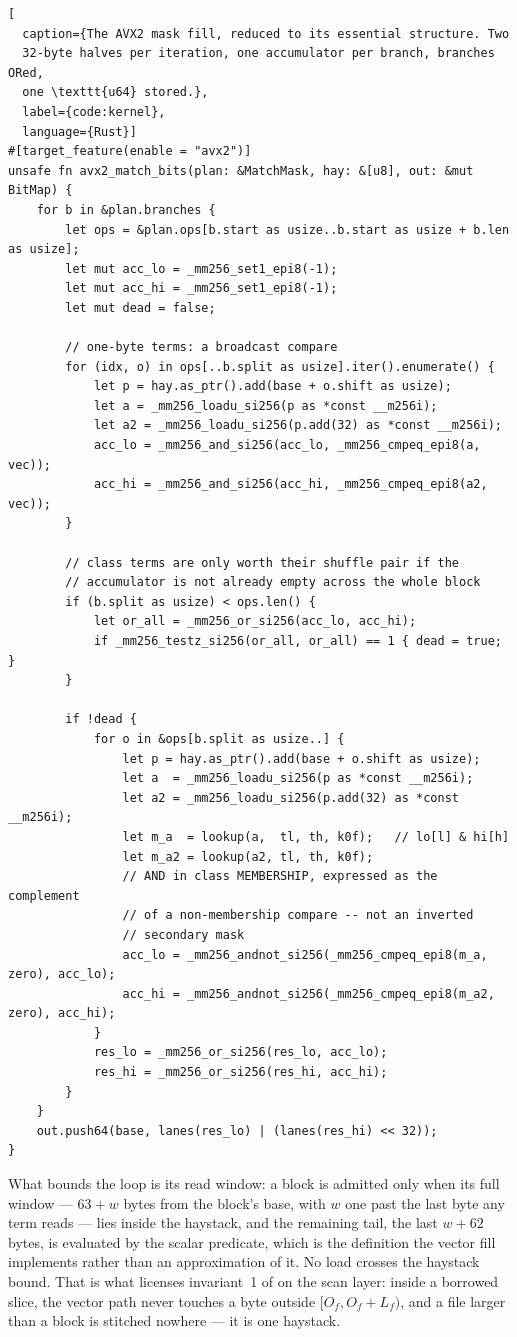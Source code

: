 \documentclass[11pt,letterpaper]{article}
\begin{document}
\begin{lstlisting}[
  caption={The AVX2 mask fill, reduced to its essential structure. Two
  32-byte halves per iteration, one accumulator per branch, branches ORed,
  one \texttt{u64} stored.},
  label={code:kernel},
  language={Rust}]
#[target_feature(enable = "avx2")]
unsafe fn avx2_match_bits(plan: &MatchMask, hay: &[u8], out: &mut BitMap) {
    for b in &plan.branches {
        let ops = &plan.ops[b.start as usize..b.start as usize + b.len as usize];
        let mut acc_lo = _mm256_set1_epi8(-1);
        let mut acc_hi = _mm256_set1_epi8(-1);
        let mut dead = false;

        // one-byte terms: a broadcast compare
        for (idx, o) in ops[..b.split as usize].iter().enumerate() {
            let p = hay.as_ptr().add(base + o.shift as usize);
            let a = _mm256_loadu_si256(p as *const __m256i);
            let a2 = _mm256_loadu_si256(p.add(32) as *const __m256i);
            acc_lo = _mm256_and_si256(acc_lo, _mm256_cmpeq_epi8(a, vec));
            acc_hi = _mm256_and_si256(acc_hi, _mm256_cmpeq_epi8(a2, vec));
        }

        // class terms are only worth their shuffle pair if the
        // accumulator is not already empty across the whole block
        if (b.split as usize) < ops.len() {
            let or_all = _mm256_or_si256(acc_lo, acc_hi);
            if _mm256_testz_si256(or_all, or_all) == 1 { dead = true; }
        }

        if !dead {
            for o in &ops[b.split as usize..] {
                let p = hay.as_ptr().add(base + o.shift as usize);
                let a  = _mm256_loadu_si256(p as *const __m256i);
                let a2 = _mm256_loadu_si256(p.add(32) as *const __m256i);
                let m_a  = lookup(a,  tl, th, k0f);   // lo[l] & hi[h]
                let m_a2 = lookup(a2, tl, th, k0f);
                // AND in class MEMBERSHIP, expressed as the complement
                // of a non-membership compare -- not an inverted
                // secondary mask
                acc_lo = _mm256_andnot_si256(_mm256_cmpeq_epi8(m_a,  zero), acc_lo);
                acc_hi = _mm256_andnot_si256(_mm256_cmpeq_epi8(m_a2, zero), acc_hi);
            }
            res_lo = _mm256_or_si256(res_lo, acc_lo);
            res_hi = _mm256_or_si256(res_hi, acc_hi);
        }
    }
    out.push64(base, lanes(res_lo) | (lanes(res_hi) << 32));
}
\end{lstlisting}

What bounds the loop is its read window: a block is admitted only when its
full window --- $63+w$ bytes from the block's base, with $w$ one past the
last byte any term reads --- lies inside the haystack, and the remaining
tail, the last $w+62$ bytes, is evaluated by the scalar predicate, which is
the definition the vector fill implements rather than an approximation of
it. No load crosses the haystack bound. That is what licenses invariant~1
of  on the scan layer: inside a borrowed slice, the
vector path never touches a byte outside $[O_f,O_f+L_f)$, and a file larger
than a block is stitched nowhere --- it is one haystack.
\end{document}
